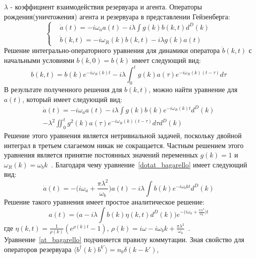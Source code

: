 $\lambda$ - коэффициент взаимодействия резервуара и агента.
Операторы рождения(уничтожения) агента и резервуара в представлении Гейзенберга:
\begin{equation}
    \begin{cases}
        & \dot{a}(t) = -i \omega_a a(t) - i \lambda \int g(k)b(k,t) d^{D}(k) \\
        & \dot{b}(k,t) = -i \omega_{R}(k) b(k,t) -i \lambda g(k)a(t)
    \end{cases}
\end{equation}
Решение интегрально-операторного уравнения для динамики оператора $\dot{b}(k,t)$ с начальными
условиями $b(k,0)=b(k)$ имеет следующий вид:
\begin{equation}
    b(k,t) = b(k)e^{-i \omega_{R}(k) t}-i \lambda \int_{0}^{t} g(k)a(\tau)e^{-i \omega_{R}(k) (t-\tau)} d\tau
\end{equation}
В результате полученного решения для $b(k,t)$, можно найти уравнение для $a(t)$, который имеет следующий вид:
\begin{multline}\label{dotat_bagarello}
    \dot{a}(t) =
    -i \omega_{a} a(t)
    -i \lambda \int g(k)b(k)e^{-i \omega_{R}(k) t} d^{D}(k) \\
    -\lambda^{2} \iint_{0}^{t} g^{2}(k) a(\tau) e^{-i \omega_{R}(k) (t-\tau)} d\tau d^{D}(k)
\end{multline}
Решение этого уравнения является нетривиальной задачей, поскольку двойной интеграл в третьем слагаемом
никак не сокращается.
Частным решением этого уравнения является принятие постоянных значений переменных $g(k) = 1$ и
$\omega_{R}(k) = \omega_{b} k$~\citep{bagarello2018quantum}.
Благодаря чему уравнение~\eqref{dotat_bagarello} имеет следующий вид:
\begin{equation}
    \dot{a}(t) =
    - \Biggl(i \omega_{a} + \frac{\pi \lambda^{2}}{\omega_{b}} \Biggr) a(t)
    -i \lambda \int b(k)e^{-i \omega_{b} k t} d^{D}(k)
\end{equation}
Решение такого уравнения имеет простое аналитическое решение:
\begin{equation}\label{at_bagarello}
    a(t) = \Biggl( a - i \lambda \int b(k) \eta(k,t) d^{D}(k) \Biggr)
    e^{-\bigl(i \omega_{a} + \frac{\pi \lambda^{2}}{\omega_{b}} \bigr) t}
\end{equation}
где $\eta(k,t) = \frac{1}{\rho(k)}(e^{\rho(k) t} - 1)$,
$\rho(k) = i\omega - i\omega_{b} k + \frac{\pi \lambda^{2}}{\omega_{b}}$~\citep{bagarello2018quantum}.
Уравнение~\eqref{at_bagarello} подчиняется правилу коммутации.
Зная свойство для операторов резервуара $\langle b^{\dagger}(k) b^{k'} \rangle = n_{b} \delta (k-k')$,

